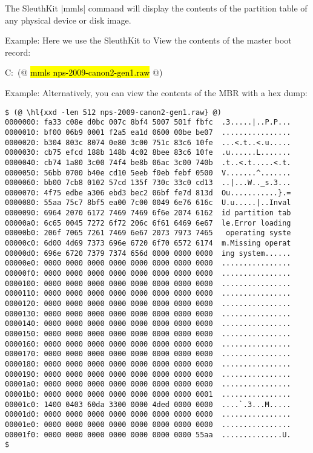 The SleuthKit |mmls| command will display the contents of the
partition table of any physical device or disk image.

Example: Here we use the SleuthKit to View the contents of the master boot
record:

\begin{code}
C:\ (@ \hl{mmls nps-2009-canon2-gen1.raw} @)
\end{code}

Example: Alternatively, you can view the contents of the MBR with a
hex dump:

\begin{Verbatim}
$ (@ \hl{xxd -len 512 nps-2009-canon2-gen1.raw} @)
0000000: fa33 c08e d0bc 007c 8bf4 5007 501f fbfc  .3.....|..P.P...
0000010: bf00 06b9 0001 f2a5 ea1d 0600 00be be07  ................
0000020: b304 803c 8074 0e80 3c00 751c 83c6 10fe  ...<.t..<.u.....
0000030: cb75 efcd 188b 148b 4c02 8bee 83c6 10fe  .u......L.......
0000040: cb74 1a80 3c00 74f4 be8b 06ac 3c00 740b  .t..<.t.....<.t.
0000050: 56bb 0700 b40e cd10 5eeb f0eb febf 0500  V.......^.......
0000060: bb00 7cb8 0102 57cd 135f 730c 33c0 cd13  ..|...W.._s.3...
0000070: 4f75 edbe a306 ebd3 bec2 06bf fe7d 813d  Ou...........}.=
0000080: 55aa 75c7 8bf5 ea00 7c00 0049 6e76 616c  U.u.....|..Inval
0000090: 6964 2070 6172 7469 7469 6f6e 2074 6162  id partition tab
00000a0: 6c65 0045 7272 6f72 206c 6f61 6469 6e67  le.Error loading
00000b0: 206f 7065 7261 7469 6e67 2073 7973 7465   operating syste
00000c0: 6d00 4d69 7373 696e 6720 6f70 6572 6174  m.Missing operat
00000d0: 696e 6720 7379 7374 656d 0000 0000 0000  ing system......
00000e0: 0000 0000 0000 0000 0000 0000 0000 0000  ................
00000f0: 0000 0000 0000 0000 0000 0000 0000 0000  ................
0000100: 0000 0000 0000 0000 0000 0000 0000 0000  ................
0000110: 0000 0000 0000 0000 0000 0000 0000 0000  ................
0000120: 0000 0000 0000 0000 0000 0000 0000 0000  ................
0000130: 0000 0000 0000 0000 0000 0000 0000 0000  ................
0000140: 0000 0000 0000 0000 0000 0000 0000 0000  ................
0000150: 0000 0000 0000 0000 0000 0000 0000 0000  ................
0000160: 0000 0000 0000 0000 0000 0000 0000 0000  ................
0000170: 0000 0000 0000 0000 0000 0000 0000 0000  ................
0000180: 0000 0000 0000 0000 0000 0000 0000 0000  ................
0000190: 0000 0000 0000 0000 0000 0000 0000 0000  ................
00001a0: 0000 0000 0000 0000 0000 0000 0000 0000  ................
00001b0: 0000 0000 0000 0000 0000 0000 0000 0001  ................
00001c0: 1400 0403 60da 3300 0000 4ded 0000 0000  ....`.3...M.....
00001d0: 0000 0000 0000 0000 0000 0000 0000 0000  ................
00001e0: 0000 0000 0000 0000 0000 0000 0000 0000  ................
00001f0: 0000 0000 0000 0000 0000 0000 0000 55aa  ..............U.
$ 
\end{Verbatim}

